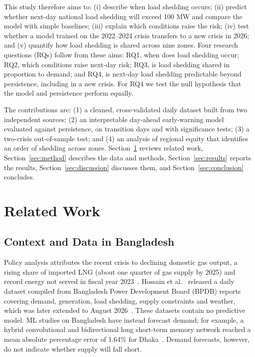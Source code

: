 \documentclass[conference]{IEEEtran}
\begin{document}
This study therefore aims to: (i) describe when load shedding occurs; (ii) predict whether next-day national load shedding will exceed 100 MW and compare the model with simple baselines; (iii) explain which conditions raise the risk; (iv) test whether a model trained on the 2022--2024 crisis transfers to a new crisis in 2026; and (v) quantify how load shedding is shared across nine zones. Four research questions (RQs) follow from these aims: RQ1, when does load shedding occur; RQ2, which conditions raise next-day risk; RQ3, is load shedding shared in proportion to demand; and RQ4, is next-day load shedding predictable beyond persistence, including in a new crisis. For RQ4 we test the null hypothesis that the model and persistence perform equally.

The contributions are: (1) a cleaned, cross-validated daily dataset built from two independent sources; (2) an interpretable day-ahead early-warning model evaluated against persistence, on transition days and with significance tests; (3) a two-crisis out-of-sample test; and (4) an analysis of regional equity that identifies an order of shedding across zones. Section~\ref{sec:related} reviews related work, Section~\ref{sec:method} describes the data and methods, Section~\ref{sec:results} reports the results, Section~\ref{sec:discussion} discusses them, and Section~\ref{sec:conclusion} concludes.

\section{Related Work}\label{sec:related}
\subsection{Context and Data in Bangladesh}
Policy analysis attributes the recent crisis to declining domestic gas output, a rising share of imported LNG (about one quarter of gas supply by 2025) and record energy not served in fiscal year 2023~\cite{cpd2025}. Hossain et al.~\cite{hossain2025} released a daily dataset compiled from Bangladesh Power Development Board (BPDB) reports covering demand, generation, load shedding, supply constraints and weather, which was later extended to August 2026~\cite{islam2026}. These datasets contain no predictive model. ML studies on Bangladesh have instead forecast demand; for example, a hybrid convolutional and bidirectional long short-term memory network reached a mean absolute percentage error of 1.64\% for Dhaka~\cite{akhter2024}. Demand forecasts, however, do not indicate whether supply will fall short.
\end{document}
